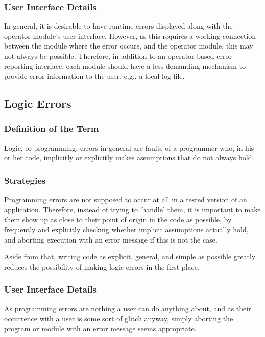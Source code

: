 \documentclass[12pt,letterpaper]{article}
\begin{document}
\subsubsection{User Interface Details}

In general, it is desirable to have runtime errors displayed
along with the operator module's user interface. However,
as this requires a working connection between the module where
the error occurs, and the operator module, this may not
always be possible. Therefore, in addition to an
operator-based error reporting interface, each module should
have a less demanding mechanism to provide error information to the
user, e.g., a local log file.

\subsection{Logic Errors}

\subsubsection{Definition of the Term}

Logic, or programming, errors in general are faults of
a programmer who, in his or her code, implicitly or explicitly
makes assumptions that do not always hold.

\subsubsection{Strategies}

Programming errors are not supposed to occur at all in
a tested version of an application. Therefore, instead
of trying to 'handle' them, it is important to make them show
up as close to their point of origin in the code as
possible, by frequently and explicitly checking whether
implicit assumptions actually hold, and aborting execution
with an error message if this is not the case.

Aside from that, writing code as explicit, general, and
simple as possible greatly reduces the possibility of making
logic errors in the first place.

\subsubsection{User Interface Details}

As programming errors are nothing a user can do anything
about, and as their occurrence with a user is some sort of
glitch anyway, simply aborting the program or module with
an error message seems appropriate.
\end{document}
